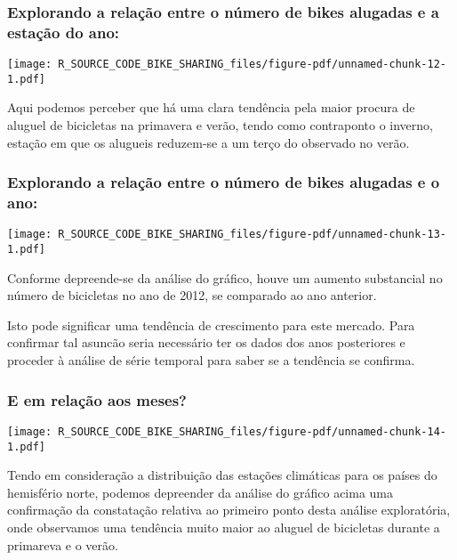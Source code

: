 \documentclass[
  letterpaper,
  DIV=11,
  numbers=noendperiod]{scrartcl}
\begin{document}
\subsubsection{Explorando a relação entre o número de bikes alugadas e a
estação do
ano:}\label{explorando-a-relauxe7uxe3o-entre-o-nuxfamero-de-bikes-alugadas-e-a-estauxe7uxe3o-do-ano}

\begin{center}
\texttt{[image: R\_SOURCE\_CODE\_BIKE\_SHARING\_files/figure-pdf/unnamed-chunk-12-1.pdf]}
\end{center}

Aqui podemos perceber que há uma clara tendência pela maior procura de
aluguel de bicicletas na primavera e verão, tendo como contraponto o
inverno, estação em que os alugueis reduzem-se a um terço do observado
no verão.

\subsubsection{Explorando a relação entre o número de bikes alugadas e o
ano:}\label{explorando-a-relauxe7uxe3o-entre-o-nuxfamero-de-bikes-alugadas-e-o-ano}

\begin{center}
\texttt{[image: R\_SOURCE\_CODE\_BIKE\_SHARING\_files/figure-pdf/unnamed-chunk-13-1.pdf]}
\end{center}

Conforme depreende-se da análise do gráfico, houve um aumento
substancial no número de bicicletas no ano de 2012, se comparado ao ano
anterior.

Isto pode significar uma tendência de crescimento para este mercado.
Para confirmar tal asuncão seria necessário ter os dados dos anos
posteriores e proceder à análise de série temporal para saber se a
tendência se confirma.

\subsubsection{E em relação aos
meses?}\label{e-em-relauxe7uxe3o-aos-meses}

\begin{center}
\texttt{[image: R\_SOURCE\_CODE\_BIKE\_SHARING\_files/figure-pdf/unnamed-chunk-14-1.pdf]}
\end{center}

Tendo em consideração a distribuição das estações climáticas para os
países do hemisfério norte, podemos depreender da análise do gráfico
acima uma confirmação da constatação relativa ao primeiro ponto desta
análise exploratória, onde observamos uma tendência muito maior ao
aluguel de bicicletas durante a primareva e o verão.
\end{document}
